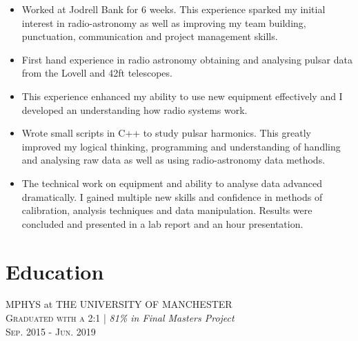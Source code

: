 \documentclass[a4paper,10pt]{article}
\begin{document}
\begin{itemize}[leftmargin=*,topsep=0pt,noitemsep,parsep=0pt,partopsep=0pt,rightmargin=0.5cm]
 \setlength\itemsep{0em}
 
    \item Worked at Jodrell Bank for 6 weeks. This experience sparked my initial interest in radio-astronomy as well as improving my team building, punctuation, communication and project management skills.
    
    \item First hand experience in radio astronomy obtaining and analysing pulsar data from the Lovell and 42ft telescopes. 
    
    \item This experience enhanced my ability to use new equipment effectively and I developed an understanding how radio systems work.
    
    \item Wrote small scripts in C++ to study pulsar harmonics.
    This greatly improved my logical thinking, programming and understanding of handling and analysing raw data as well as using radio-astronomy data methods.

    \item The technical work on equipment and ability to analyse data advanced dramatically. I gained multiple new skills and confidence in methods of calibration, analysis techniques and data manipulation. Results were concluded and presented in a lab report and an hour presentation.

\end{itemize}
 
\section{Education}
MPHYS at THE UNIVERSITY OF MANCHESTER\\ 
 \textsc {Graduated with a 2:1} | \small\emph{81\% in Final Masters Project}\\
  \textsc{Sep.} 2015 - \textsc{ Jun}. 2019
\end{document}
